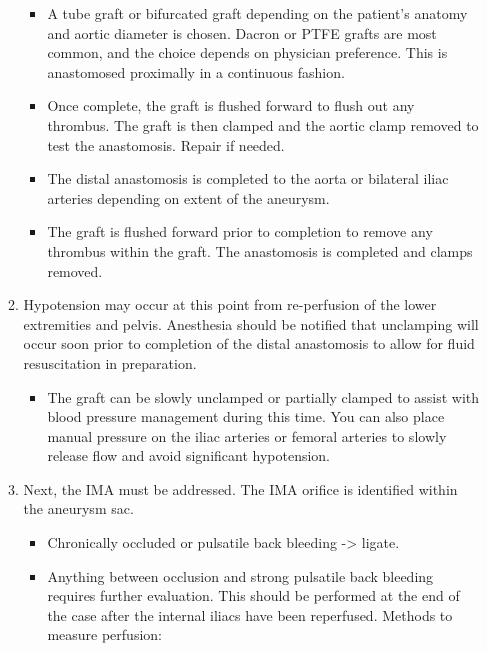 \documentclass[
]{book}
\providecommand{\tightlist}{%
  \setlength{\itemsep}{0pt}\setlength{\parskip}{0pt}}
\begin{document}
\begin{itemize}
\begin{enumerate}
    \begin{itemize}
    \item
      A tube graft or bifurcated graft depending on the patient's
      anatomy and aortic diameter is chosen. Dacron or PTFE grafts
      are most common, and the choice depends on physician
      preference. This is anastomosed proximally in a continuous
      fashion.
    \item
      Once complete, the graft is flushed forward to flush out any
      thrombus. The graft is then clamped and the aortic clamp
      removed to test the anastomosis. Repair if needed.
    \item
      The distal anastomosis is completed to the aorta or
      bilateral iliac arteries depending on extent of the
      aneurysm.
    \item
      The graft is flushed forward prior to completion to remove
      any thrombus within the graft. The anastomosis is completed
      and clamps removed.~
    \end{itemize}
  \item
    Hypotension may occur at this point from re-perfusion of the
    lower extremities and pelvis. Anesthesia should be notified that
    unclamping will occur soon prior to completion of the distal
    anastomosis to allow for fluid resuscitation in preparation.

    \begin{itemize}
    \tightlist
    \item
      The graft can be slowly unclamped or partially clamped to
      assist with blood pressure management during this time. You
      can also place manual pressure on the iliac arteries or
      femoral arteries to slowly release flow and avoid
      significant hypotension.
    \end{itemize}
  \item
    Next, the IMA must be addressed. The IMA orifice is identified
    within the aneurysm sac.~

    \begin{itemize}
    \item
      Chronically occluded or pulsatile back bleeding -\textgreater{} ligate.
    \item
      Anything between occlusion and strong pulsatile back
      bleeding requires further evaluation. This should be
      performed at the end of the case after the internal iliacs
      have been reperfused. Methods to measure perfusion:


\end{itemize}
\end{enumerate}
\end{itemize}
\end{document}
